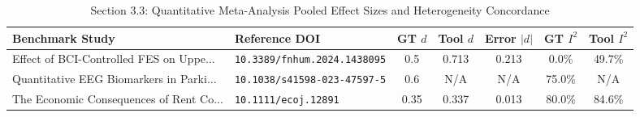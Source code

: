 \begin{table}[t]
\centering
\small
\caption{Section 3.3: Quantitative Meta-Analysis Pooled Effect Sizes and Heterogeneity Concordance}
\label{tab:validation_meta_analysis}
\begin{tabular}{p{5.0cm}p{3.5cm}ccccc}
\hline
\textbf{Benchmark Study} & \textbf{Reference DOI} & \textbf{GT $d$} & \textbf{Tool $d$} & \textbf{Error $|d|$} & \textbf{GT $I^2$} & \textbf{Tool $I^2$} \\
\hline
Effect of BCI-Controlled FES on Uppe... & \texttt{10.3389/fnhum.2024.1438095} & 0.5 & 0.713 & 0.213 & 0.0\% & 49.7\% \\
Quantitative EEG Biomarkers in Parki... & \texttt{10.1038/s41598-023-47597-5} & 0.6 & N/A & N/A & 75.0\% & N/A \\
The Economic Consequences of Rent Co... & \texttt{10.1111/ecoj.12891} & 0.35 & 0.337 & 0.013 & 80.0\% & 84.6\% \\
\hline
\end{tabular}
\end{table}

